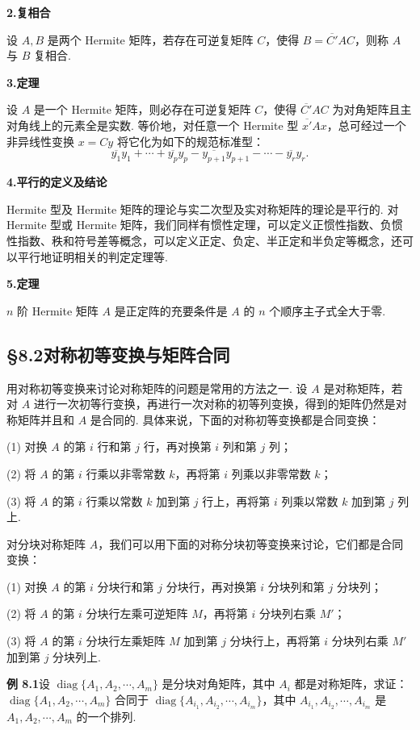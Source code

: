 \documentclass[UTF8,12pt,a4paper,fontset=fandol]{ctexart}
\begin{document}
\noindent\textbf{2.\quad 复相合}

设 $A,B$ 是两个 Hermite 矩阵，若存在可逆复矩阵 $C$，使得 $B=\overline{C'}AC$，则称 $A$ 与 $B$ 复相合.

\noindent\textbf{3.\quad 定理}

设 $A$ 是一个 Hermite 矩阵，则必存在可逆复矩阵 $C$，使得 $\overline{C'}AC$ 为对角矩阵且主对角线上的元素全是实数. 等价地，对任意一个 Hermite 型 $\overline{x'}Ax$，总可经过一个非异线性变换 $x=Cy$ 将它化为如下的规范标准型：
\[
\overline{y_1}y_1+\cdots+\overline{y_p}y_p-\overline{y_{p+1}}y_{p+1}-\cdots-\overline{y_r}y_r.
\]

\noindent\textbf{4.\quad 平行的定义及结论}

Hermite 型及 Hermite 矩阵的理论与实二次型及实对称矩阵的理论是平行的. 对 Hermite 型或 Hermite 矩阵，我们同样有惯性定理，可以定义正惯性指数、负惯性指数、秩和符号差等概念，可以定义正定、负定、半正定和半负定等概念，还可以平行地证明相关的判定定理等.

\noindent\textbf{5.\quad 定理}

$n$ 阶 Hermite 矩阵 $A$ 是正定阵的充要条件是 $A$ 的 $n$ 个顺序主子式全大于零.

\subsection*{§8.2\quad 对称初等变换与矩阵合同}

用对称初等变换来讨论对称矩阵的问题是常用的方法之一. 设 $A$ 是对称矩阵，若对 $A$ 进行一次初等行变换，再进行一次对称的初等列变换，得到的矩阵仍然是对称矩阵并且和 $A$ 是合同的. 具体来说，下面的对称初等变换都是合同变换：

(1) 对换 $A$ 的第 $i$ 行和第 $j$ 行，再对换第 $i$ 列和第 $j$ 列；

(2) 将 $A$ 的第 $i$ 行乘以非零常数 $k$，再将第 $i$ 列乘以非零常数 $k$；

(3) 将 $A$ 的第 $i$ 行乘以常数 $k$ 加到第 $j$ 行上，再将第 $i$ 列乘以常数 $k$ 加到第 $j$ 列上.

对分块对称矩阵 $A$，我们可以用下面的对称分块初等变换来讨论，它们都是合同变换：

(1) 对换 $A$ 的第 $i$ 分块行和第 $j$ 分块行，再对换第 $i$ 分块列和第 $j$ 分块列；

(2) 将 $A$ 的第 $i$ 分块行左乘可逆矩阵 $M$，再将第 $i$ 分块列右乘 $M'$；

(3) 将 $A$ 的第 $i$ 分块行左乘矩阵 $M$ 加到第 $j$ 分块行上，再将第 $i$ 分块列右乘 $M'$ 加到第 $j$ 分块列上.

\noindent\textbf{例 8.1}\quad 设 $\operatorname{diag}\{A_1,A_2,\cdots,A_m\}$ 是分块对角矩阵，其中 $A_i$ 都是对称矩阵，求证：$\operatorname{diag}\{A_1,A_2,\cdots,A_m\}$ 合同于 $\operatorname{diag}\{A_{i_1},A_{i_2},\cdots,A_{i_m}\}$，其中 $A_{i_1},A_{i_2},\cdots,A_{i_m}$ 是 $A_1,A_2,\cdots,A_m$ 的一个排列.
\end{document}

